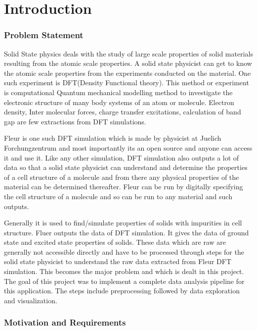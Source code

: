 
\chapter{Introduction}
\label{chap:intro}

\subsection{Problem Statement}
Solid State physics deals with the study of large scale properties of solid materials resulting from the atomic scale properties. A solid state physicist can get to know the atomic scale properties from the experiments conducted on the material. One such experiment is DFT(Density Functional theory). This method or experiment is computational Quantum mechanical modelling method to investigate the electronic structure of many body systems of an atom or molecule. Electron density, Inter molecular forces, charge transfer excitations, calculation of band gap are few extractions from DFT  simulations. 

Fleur is one such DFT simulation which is made by physicist at Juelich Forchungzentrum and most importantly its an open source and anyone can access it and use it. Like any other simulation, DFT simulation also outputs a lot of data so that a solid state physicist can understand and determine the properties of a cell structure of a molecule and from there any physical properties of the material can be determined thereafter. Fleur can be run by digitally specifying the cell structure of a molecule and so can be run to any material and such outputs.

Generally it is used to find/simulate properties of solids with impurities in cell structure. Fluer outputs the data of DFT simulation. It gives the data of ground state and excited state properties of solids. These data which are raw are generally not accessible directly and have to be processed through steps for the solid state physicist to understand the raw data extracted from Fleur DFT simulation. This becomes the major problem and which is dealt in this project. The goal of this project was to implement a complete data analysis pipeline for this application. The steps include preprocessing followed by data exploration and visualization.

\subsection{Motivation and Requirements}


